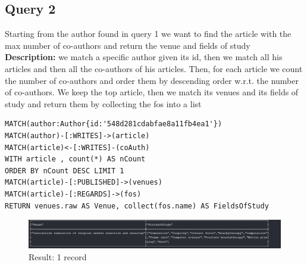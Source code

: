 \documentclass{Configuration_Files/PoliMi3i_thesis}
\begin{document}
\subsection{Query 2}
Starting from the author found in query 1 we want to find the article with the max number of co-authors and return the venue and fields of study\\
\textbf{Description:} we match a specific author given its id, then we match all his articles and then all the co-authors of his articles.
Then, for each article we count the number of co-authors and order them by descending order w.r.t. the number of co-authors.
We keep the top article, then we match its venues and its fields of study and return them by collecting the fos into a list
\begin{lstlisting}[language=cypher, label=lst:cypher-example]
MATCH(author:Author{id:'548d281cdabfae8a11fb4ea1'})
MATCH(author)-[:WRITES]->(article)
MATCH(article)<-[:WRITES]-(coAuth)
WITH article , count(*) AS nCount
ORDER BY nCount DESC LIMIT 1
MATCH(article)-[:PUBLISHED]->(venues)
MATCH(article)-[:REGARDS]->(fos)
RETURN venues.raw AS Venue, collect(fos.name) AS FieldsOfStudy
\end{lstlisting}
\begin{figure}[H]
\centering
\includegraphics[width=1\textwidth]{query/query2.PNG}
\caption{Result: 1 record}
\label{fig:query2}
\end{figure}
\end{document}
